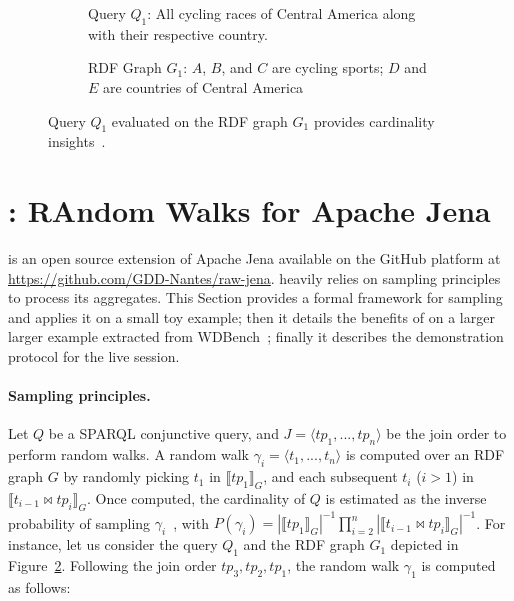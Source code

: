 
\begin{figure}
  \setlength{\fboxsep}{0pt} %
  \begin{subfigure}{0.48\textwidth}
    \caption{\label{fig:q1-j2-1hop}Query $Q_1$: All cycling races of Central America along
      with their respective country.}
  \end{subfigure}
  \hfill
  \begin{subfigure}{0.48\textwidth}
    \fbox{%
      \resizebox{\textwidth}{!}{%
        
    }}
    \caption{RDF Graph $G_1$: $A$, $B$, and $C$ are cycling sports; $D$ and $E$
      are countries of Central America~\cite{10.1007/978-3-031-33455-9_3}}
  \end{subfigure}
  \caption{\label{fig:random_walks_example}Query $Q_1$ evaluated on
    the RDF graph $G_1$ provides cardinality insights~\cite{10.1007/978-3-031-33455-9_3}.}
\end{figure}

\section{\NAME: RAndom Walks for Apache Jena}
\label{sec:proposal}

\NAME is an open source extension of Apache Jena available on the
GitHub platform at \url{https://github.com/GDD-Nantes/raw-jena}.
\NAME heavily relies on sampling principles to process its
aggregates. This Section provides a formal framework for sampling and
applies it on a small toy example; then it details the benefits of
\NAME on a larger larger example extracted from
WDBench~\cite{angles2022wdbench}; finally it describes the
demonstration protocol for the live session.

\paragraph{Sampling principles.}

Let $Q$ be a SPARQL conjunctive query, and $J = \langle tp_1, ..., tp_n \rangle$ be
the join order to perform random walks. A random walk
$\gamma_i = \langle t_1, ..., t_n\rangle$ is computed over
an RDF graph $G$ by randomly picking $t_1$ in $\llbracket tp_1 \rrbracket_G$,
and each subsequent $t_i$ ($i > 1$) in $\llbracket t_{i-1} \bowtie tp_i \rrbracket_G$.
Once computed, the cardinality of $Q$ is estimated as  the inverse probability
of sampling $\gamma_i$~\cite{li2019wanderjoin}, with $P(\gamma_i) = |\llbracket tp_1 \rrbracket_G|^{-1} \prod_{i=2}^{n}
|\llbracket t_{i-1} \bowtie tp_i \rrbracket_G|^{-1}$.
%
For instance, let us consider the query $Q_1$ and the RDF graph $G_1$
depicted in Figure~\ref{fig:random_walks_example}. Following the join order $tp_3,tp_2,tp_1$, the random walk $\gamma_1$ is computed as
follows:

